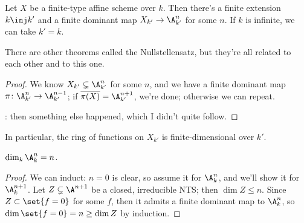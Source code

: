 \begin{cor}[Nullstellensatz]
Let $X$ be a finite-type affine scheme over $k$. Then there's a finite extension $k\inj k'$ and a finite dominant
map $X_{k'}\to\A_{k'}^n$ for some $n$. If $k$ is infinite, we can take $k' = k$.
\end{cor}
There are other theorems called the Nullstellensatz, but they're all related to each other and to this one.
\begin{proof}
We know $X_{k'}\subsetneq \A_{k'}^n$ for some $n$, and we have a finite dominant map
$\pi\colon\A_{k'}^n\to\A_{k'}^{n-1}$; if $\overline{\pi(X)} = \A_{k'}^{n+1}$, we're done; otherwise we can repeat.

\TODO: then something else happened, which I didn't quite follow.
\end{proof}
In particular, the ring of functions on $X_{k'}$ is finite-dimensional over $k'$.
\begin{cor}
$\dim_k \A_k^n = n$.
\end{cor}
\begin{proof}
We can induct: $n = 0$ is clear, so assume it for $\A_k^n$, and we'll show it for $\A_k^{n+1}$. Let $Z\subsetneq
\A^{n+1}$ be a closed, irreducible NTS; then $\dim Z\le n$. Since $Z\subset\set{f = 0}$ for some $f$, then it
admits a finite dominant map to $\A_k^n$, so $\dim\set{f = 0} = n\ge\dim Z$ by induction.
\end{proof}
